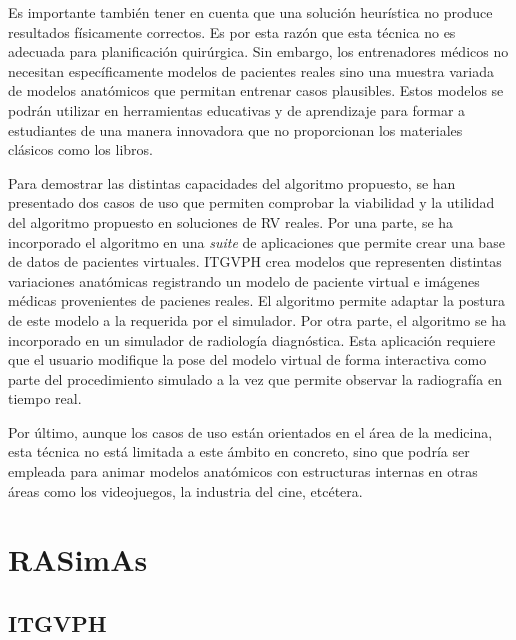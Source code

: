 Es importante también tener en cuenta que una solución heurística no produce resultados físicamente correctos. Es por esta razón que esta técnica no es adecuada para planificación quirúrgica. Sin embargo, los entrenadores médicos no necesitan específicamente modelos de pacientes reales sino una muestra variada de modelos anatómicos que permitan entrenar casos plausibles. Estos modelos se podrán utilizar en herramientas educativas y de aprendizaje para formar a estudiantes de una manera innovadora que no proporcionan los materiales clásicos como los libros.

Para demostrar las distintas capacidades del algoritmo propuesto, se han presentado dos casos de uso que permiten comprobar la viabilidad y la utilidad del algoritmo propuesto en soluciones de \ac{RV} reales. 
%
Por una parte, se ha incorporado el algoritmo en una \emph{suite} de aplicaciones que permite crear una base de datos de pacientes virtuales.
\ac{ITGVPH} crea modelos que representen distintas  variaciones anatómicas registrando un modelo de paciente virtual e imágenes médicas provenientes de pacienes reales. 
El algoritmo permite 
adaptar la postura de este modelo a la requerida por el simulador.
%
Por otra parte, el algoritmo se ha incorporado en un simulador de radiología diagnóstica. Esta aplicación requiere que el usuario modifique la pose del modelo virtual de forma interactiva como parte del procedimiento simulado a la vez que permite observar la radiografía en tiempo real. %


Por último, aunque los casos de uso están orientados en el área de la medicina, esta técnica no está limitada a este ámbito en concreto, sino que podría ser empleada para animar modelos anatómicos con estructuras internas en otras áreas como los videojuegos, la industria del cine, etcétera.
 

\section{RASimAs}


\subsection{ITGVPH}
\label{conclu:herramienta}

